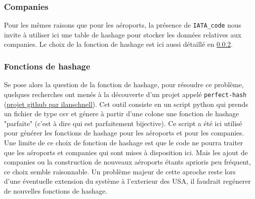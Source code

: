 \documentclass[a4paper, 12pt]{article}
\begin{document}
	\subsubsection{Companies}
	Pour les mêmes raisons que pour les aéroports, la présence de \lstinline|IATA_code| nous invite à utiliser ici une table de hashage pour stocker les données relatives aux companies.
	Le choix de la fonction de hashage est ici aussi détaillé en \ref{2.1.3}.\\
	
	\subsubsection{Fonctions de hashage} \label{2.1.3}
	Se pose alors la question de la fonction de hashage, pour résoudre ce problème, quelques recherches ont menés à la découverte d'un projet appelé \lstinline|perfect-hash| (\href{https://github.com/ilanschnell/perfect-hash}{projet github par ilanschnell}). Cet outil consiste en un script python qui prends un fichier de type csv et génere à partir d'une colone une fonction de hashage "parfaite" (c'est à dire qui est parfaitement bijective). Ce script a été ici utilisé pour générer les fonctions de hashage pour les aéroports et pour les companies.\\
	
	Une limite de ce choix de fonction de hashage est que le code ne pourra traiter que les aéroports et companies qui sont mises à disposition ici. Mais les ajout de companies ou la construction de nouveaux aéroports étants aprioris peu fréquent, ce choix semble raisonnable. Un problème majeur de cette aproche reste lors d'une éventuelle extension du système à l'exterieur des USA, il faudrait regénerer de nouvelles fonctions de hashage.
	
\end{document}
